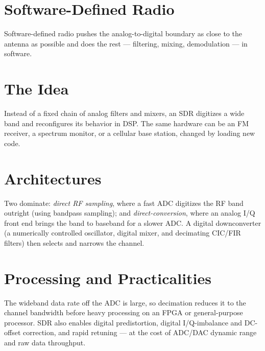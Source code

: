 \section{Software-Defined Radio}\label{sec:tb_sdr}



Software-defined radio pushes the analog-to-digital boundary as close to the
antenna as possible and does the rest --- filtering, mixing, demodulation --- in
software.

\section{The Idea}
Instead of a fixed chain of analog filters and mixers, an SDR digitizes a wide
band and reconfigures its behavior in DSP. The same hardware can be an FM
receiver, a spectrum monitor, or a cellular base station, changed by loading new
code.

\section{Architectures}
Two dominate: \emph{direct RF sampling}, where a fast ADC digitizes the RF band
outright (using bandpass sampling); and \emph{direct-conversion}, where an
analog I/Q front end brings the band to baseband for a slower ADC. A digital
downconverter (a numerically controlled oscillator, digital mixer, and decimating
CIC/FIR filters) then selects and narrows the channel.

\section{Processing and Practicalities}
The wideband data rate off the ADC is large, so decimation reduces it to the
channel bandwidth before heavy processing on an FPGA or general-purpose
processor. SDR also enables digital predistortion, digital I/Q-imbalance and
DC-offset correction, and rapid retuning --- at the cost of ADC/DAC dynamic range
and raw data throughput.



